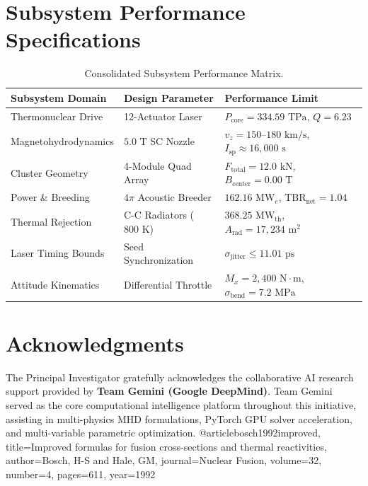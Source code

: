 \documentclass[10pt,3p,twocolumn]{article}
\begin{document}
\section{Subsystem Performance Specifications}

\begin{table}[h!]
\centering
\small
\begin{tabular}{@{}llp{2.8cm}@{}}
\toprule
\textbf{Subsystem Domain} & \textbf{Design Parameter} & \textbf{Performance Limit} \\ \midrule
Thermonuclear Drive & 12-Actuator Laser & $P_{\text{core}} = 334.59\text{ TPa}$, $Q = 6.23$ \\
Magnetohydrodynamics & $5.0\text{ T}$ SC Nozzle & $v_z = 150\text{--}180\text{ km/s}$, $I_{\text{sp}} \approx 16,000\text{ s}$ \\
Cluster Geometry & 4-Module Quad Array & $F_{\text{total}} = 12.0\text{ kN}$, $B_{\text{center}} = 0.00\text{ T}$ \\
Power \& Breeding & $4\pi$ Acoustic Breeder & $162.16\text{ MW}_e$, $\text{TBR}_{\text{net}} = 1.04$ \\
Thermal Rejection & C-C Radiators ($800\text{ K}$) & $368.25\text{ MW}_{\text{th}}$, $A_{\text{rad}} = 17,234\text{ m}^2$ \\
Laser Timing Bounds & Seed Synchronization & $\sigma_{\text{jitter}} \le 11.01\text{ ps}$ \\
Attitude Kinematics & Differential Throttle & $M_x = 2,400\text{ N}\cdot\text{m}$, $\sigma_{\text{bend}} = 7.2\text{ MPa}$ \\ \bottomrule
\end{tabular}
\caption{Consolidated Subsystem Performance Matrix.}
\end{table}

\section{Acknowledgments}
The Principal Investigator gratefully acknowledges the collaborative AI research support provided by \textbf{Team Gemini (Google DeepMind)}. Team Gemini served as the core computational intelligence platform throughout this initiative, assisting in multi-physics MHD formulations, PyTorch GPU solver acceleration, and multi-variable parametric optimization.
@article{bosch1992improved,
  title={Improved formulas for fusion cross-sections and thermal reactivities},
  author={Bosch, H-S and Hale, GM},
  journal={Nuclear Fusion},
  volume={32},
  number={4},
  pages={611},
  year={1992}
}
\end{document}
